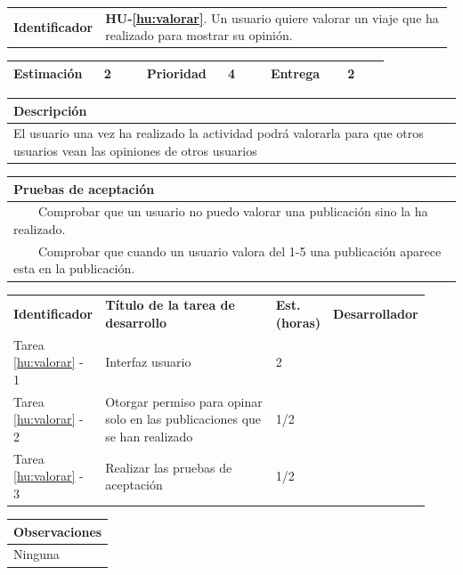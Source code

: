 \documentclass[11pt]{article}
\newcommand{\tabitem}{~~\llap{\textbullet}~~}
\begin{document}
\begin{longtable}{p{0.18\linewidth}|p{0.8\linewidth}}
  \rowcolor{LightCyan}
  \textbf{Identificador} & \textbf{HU-\ref{hu:valorar}}. Un usuario quiere valorar un viaje que ha realizado para mostrar su opinión. \\  
\end{longtable}
\vspace{-0.8cm}
\begin{longtable}{p{0.18\linewidth}|p{0.1\linewidth}|p{0.18\linewidth}|p{0.1\linewidth}|p{0.18\linewidth}|p{0.1\linewidth}}
  \toprule
  \textbf{Estimación} & 2 & \textbf{Prioridad} & 4 & \textbf{Entrega} & 2 \\
  \bottomrule
\end{longtable}
\vspace{-0.8cm}
\begin{longtable}{p{1.028\linewidth}}
  \textbf{Descripción}\\
  \midrule
  El usuario una vez ha realizado la actividad podrá valorarla para que otros usuarios vean las opiniones de otros usuarios
 \\
  \bottomrule
\end{longtable}
\vspace{-0.8cm}
\begin{longtable}{p{1.028\linewidth}}
  \textbf{Pruebas de aceptación}\\
  \midrule
  \tabitem Comprobar que un usuario no puedo valorar una publicación sino la ha realizado.\\
  \tabitem Comprobar que cuando un usuario valora del 1-5 una publicación aparece esta en la publicación.\\
\end{longtable}
\vspace{-0.8cm}
\begin{longtable}{p{0.18\linewidth}|p{0.48\linewidth}|p{0.1\linewidth}|p{0.17\linewidth}}
  \toprule
  \textbf{Identificador} & \textbf{Título de la tarea de desarrollo} & \textbf{Est. (horas)} & \textbf{Desarrollador} \\
  Tarea \ref{hu:valorar} - 1 & Interfaz usuario & 2 &\\
  Tarea \ref{hu:valorar} - 2 &  Otorgar permiso para opinar solo en las publicaciones que se han realizado & 1/2 & \\
  Tarea \ref{hu:valorar} - 3 & Realizar las pruebas de aceptación & 1/2 & \\
  \bottomrule
\end{longtable}
\vspace{-0.8cm}
\begin{longtable}{p{1.028\linewidth}}
  \textbf{Observaciones}\\
  \midrule
  Ninguna\\
  \bottomrule
\end{longtable}
\end{document}
